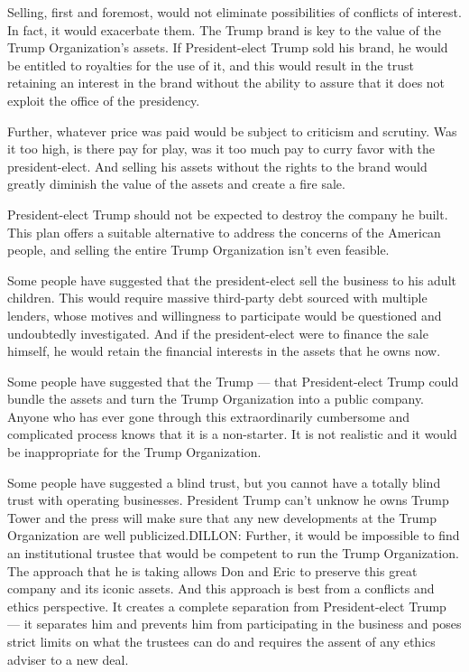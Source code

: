 Selling, first and foremost, would not eliminate possibilities of
conflicts of interest. In fact, it would exacerbate them. The Trump
brand is key to the value of the Trump Organization's assets. If
President-elect Trump sold his brand, he would be entitled to royalties
for the use of it, and this would result in the trust retaining an
interest in the brand without the ability to assure that it does not
exploit the office of the presidency.

Further, whatever price was paid would be subject to criticism and
scrutiny. Was it too high, is there pay for play, was it too much pay to
curry favor with the president-elect. And selling his assets without the
rights to the brand would greatly diminish the value of the assets and
create a fire sale.

President-elect Trump should not be expected to destroy the company he
built. This plan offers a suitable alternative to address the concerns
of the American people, and selling the entire Trump Organization isn't
even feasible.

Some people have suggested that the president-elect sell the business to
his adult children. This would require massive third-party debt sourced
with multiple lenders, whose motives and willingness to participate
would be questioned and undoubtedly investigated. And if the
president-elect were to finance the sale himself, he would retain the
financial interests in the assets that he owns now.

Some people have suggested that the Trump --- that President-elect Trump
could bundle the assets and turn the Trump Organization into a public
company. Anyone who has ever gone through this extraordinarily
cumbersome and complicated process knows that it is a non-starter. It is
not realistic and it would be inappropriate for the Trump Organization.

Some people have suggested a blind trust, but you cannot have a totally
blind trust with operating businesses. President Trump can't unknow he
owns Trump Tower and the press will make sure that any new developments
at the Trump Organization are well publicized.DILLON: Further, it would
be impossible to find an institutional trustee that would be competent
to run the Trump Organization. The approach that he is taking allows Don
and Eric to preserve this great company and its iconic assets. And this
approach is best from a conflicts and ethics perspective. It creates a
complete separation from President-elect Trump --- it separates him and
prevents him from participating in the business and poses strict limits
on what the trustees can do and requires the assent of any ethics
adviser to a new deal.

